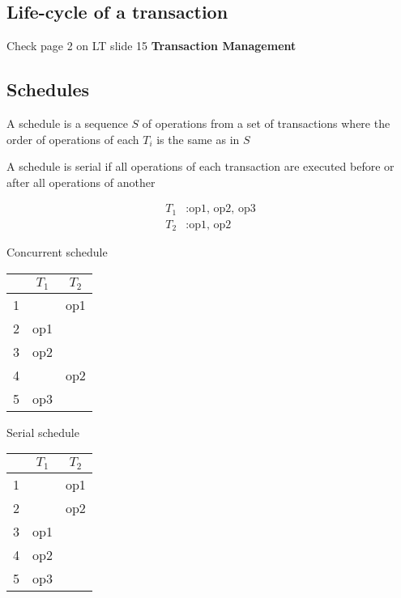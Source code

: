 \documentclass{article}
\begin{document}
\subsection{Life-cycle of a transaction}
Check page 2 on LT slide 15 \textbf{Transaction Management}
\subsection{Schedules}
A schedule is a sequence $S$ of operations from a set of transactions
where the order of operations of each $T_i$ is the same as in $S$

A schedule is serial if all operations of each transaction are executed before or after all operations of another

\begin{multicols}{3}
  \[\begin{split}
      T_1&: \text{op1, op2, op3}\\
      T_2&: \text{op1, op2}
    \end{split}\]
    \linebreak
    \linebreak
  \begin{center}
    Concurrent schedule\\
    \begin{tabular}{c|c|c}
        & $T_1$ & $T_2$ \\ \hline
      1 &       & op1   \\
      2 & op1   &       \\
      3 & op2   &       \\
      4 &       & op2   \\
      5 & op3   &\\
    \end{tabular}
  \end{center}
  \begin{center}
    Serial schedule\\
    \begin{tabular}{c|c|c}
        & $T_1$ & $T_2$ \\ \hline
      1 &       & op1   \\
      2 &       & op2   \\
      3 & op1   &       \\
      4 & op2   &       \\
      5 & op3   &
    \end{tabular}
  \end{center}
\end{multicols}
\end{document}
